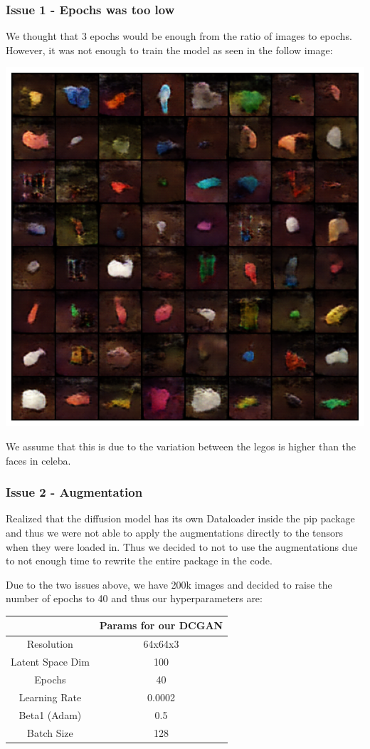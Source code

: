 \documentclass{article}
\begin{document}
\subsubsection*{Issue 1 - Epochs was too low}
We thought that 3 epochs would be enough from the ratio of images to epochs. However, it 
was not enough to train the model as seen in the follow image:
\begin{center}
\includegraphics[scale=0.5]{./imgs/3epochs.png}
\end{center}
We assume that this is due to the variation between the legos is higher than the faces in celeba.

\subsubsection*{Issue 2 - Augmentation}
Realized that the diffusion model has its own Dataloader inside the pip package and thus we were
not able to apply the augmentations directly to the tensors when they were loaded in. Thus we decided
to not to use the augmentations due to not enough time to rewrite the entire package in the code.

\noindent Due to the two issues above, we have 200k images and decided to raise the number 
of epochs to 40 and thus our hyperparameters are:
\begin{center}
\begin{tabular}{|c|c|}
\hline
& Params for our DCGAN \\ \hline
Resolution & 64x64x3 \\ \hline
Latent Space Dim & 100 \\ \hline
Epochs & 40 \\ \hline
Learning Rate & 0.0002 \\ \hline
Beta1 (Adam) & 0.5 \\ \hline
Batch Size & 128 \\ \hline
\end{tabular}
\end{center}
\end{document}
